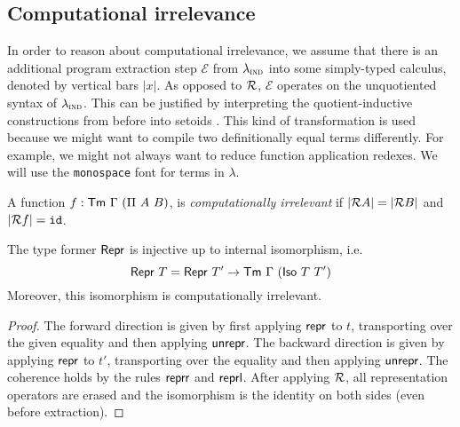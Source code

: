 \subsection{Computational irrelevance}

In order to reason about computational irrelevance, we assume that there is
an additional program extraction step $\mathcal{E}$ from $\lambda_{\textsc{ind}}$ into some
simply-typed calculus, denoted by vertical bars $|x|$. As opposed to
$\mathcal{R}$, $\mathcal{E}$ operates on the unquotiented syntax of $\lambda_{\textsc{ind}}$. This
can be justified by interpreting the quotient-inductive constructions from
before into setoids \cite{Kovacs2022-vb}. This kind of transformation is used
because we might want to compile two definitionally equal terms differently. For
example, we might not always want to reduce function application redexes. We
will use the \texttt{monospace} font for terms in $\lambda$.

\begin{definition}
    A function $f : \mta{Tm}\ \Gamma\ (\Pi\ A\ B)$, is \emph{computationally irrelevant} if
    $|\mathcal{R} A| = |\mathcal{R} B|$ and $|\mathcal{R} f| = \texttt{id}$.
\end{definition}

\begin{theorem}
	The type former $\textsf{Repr}{}$ is injective up to internal isomorphism, i.e.
	\begin{equation}
	\mta{Repr}\ T = \mta{Repr}\ T' \to \Tm\ \Gamma\ (\mta{Iso}\ T\ T')
	\end{equation}
	Moreover, this isomorphism is computationally irrelevant.
	\begin{proof}
	The forward direction is given by first applying $\textsf{repr}$ to $t$,
	transporting over the given equality and then applying $\textsf{unrepr}$. The
	backward direction is given by applying $\textsf{repr}$ to $t'$, transporting
	over the equality and then applying $\textsf{unrepr}$. The coherence holds by
	the rules $\textsf{reprr}$ and $\textsf{reprl}$. After applying $\mathcal{R}$, all
	representation operators are erased and the isomorphism is the identity on both
	sides (even before extraction).
	\end{proof}
\end{theorem}

